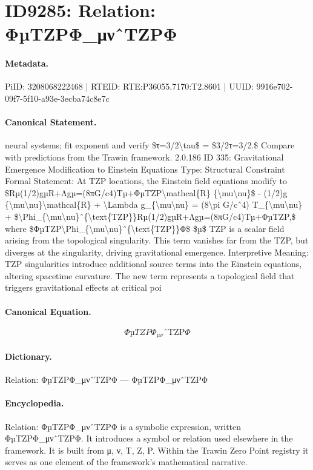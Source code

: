 \section*{ID9285: Relation: ΦµTZPΦ\_μνˆTZPΦ}
\paragraph{Metadata.}
PiID: 3208068222468 | RTEID: RTE:P36055.7170:T2.8601 | UUID: 9916e702-09f7-5f10-a93e-3ecba74c8e7c

\paragraph{Canonical Statement.}
neural systems; fit exponent and verify \$τ=3/2\textbackslash{}tau\$ = \$3/2τ=3/2.\$ Compare with predictions from the Trawin framework. 2.0.186 ID 335: Gravitational Emergence Modification to Einstein Equations Type: Structural Constraint Formal Statement: At TZP locations, the Einstein field equations modify to \$Rµ(1/2)gµR+Λgµ=(8πG/c4)Tµ+ΦµTZP\textbackslash{}mathcal\{R\} \{\textbackslash{}mu\textbackslash{}nu\}\$ - (1/2)g \{\textbackslash{}mu\textbackslash{}nu\}\textbackslash{}mathcal\{R\} + \textbackslash{}Lambda g\_\{\textbackslash{}mu\textbackslash{}nu\} = (8\textbackslash{}pi G/cˆ4) T\_\{\textbackslash{}mu\textbackslash{}nu\} + \$\textbackslash{}Phi\_\{\textbackslash{}mu\textbackslash{}nu\}ˆ\{\textbackslash{}text\{TZP\}\}Rµ(1/2)gµR+Λgµ=(8πG/c4)Tµ+ΦµTZP,\$ where \$ΦµTZP\textbackslash{}Phi\_\{\textbackslash{}mu\textbackslash{}nu\}ˆ\{\textbackslash{}text\{TZP\}\}Φ\$ \$µ\$ TZP is a scalar field arising from the topological singularity. This term vanishes far from the TZP, but diverges at the singularity, driving gravitational emergence. Interpretive Meaning: TZP singularities introduce additional source terms into the Einstein equations, altering spacetime curvature. The new term represents a topological field that triggers gravitational effects at critical poi

\paragraph{Canonical Equation.}
\[
ΦµTZP\Phi_{\mu\nu}ˆ{\text{TZP}}Φ
\]

\paragraph{Dictionary.}
Relation: ΦµTZPΦ\_μνˆTZPΦ — ΦµTZPΦ\_μνˆTZPΦ

\paragraph{Encyclopedia.}
Relation: ΦµTZPΦ\_μνˆTZPΦ is a symbolic expression, written ΦµTZPΦ\_μνˆTZPΦ. It introduces a symbol or relation used elsewhere in the framework. It is built from μ, ν, T, Z, P. Within the Trawin Zero Point registry it serves as one element of the framework's mathematical narrative.
